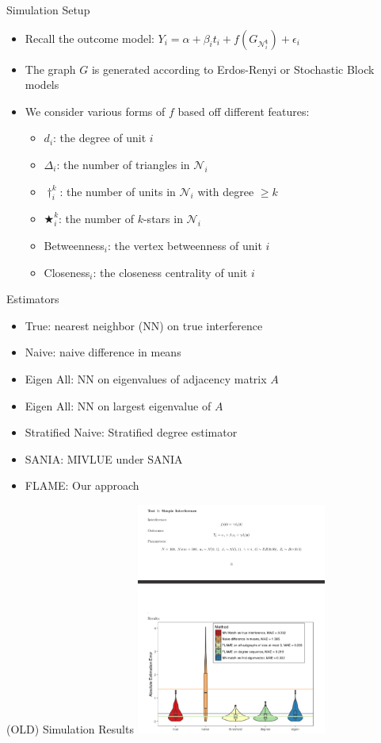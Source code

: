 \documentclass[newPxFont,numfooter,sectionpages]{beamer}
\begin{document}
\begin{frame}{Simulation Setup}
	\begin{itemize}
		\item Recall the outcome model: $Y_i = \alpha + \beta_i t_i + f(G_{\mathcal{N}_i^\mathbf{t}}) + \epsilon_i$
		\item The graph $G$ is generated according to Erdos-Renyi or Stochastic Block models
		\item We consider various forms of $f$ based off different features:
		\begin{itemize}
			\item $d_i$: the degree of unit $i$
   			 \item $\Delta_i$: the number of triangles in $\mathcal{N}_i$
   			 \item $\dagger_i^k$: the number of units in $\mathcal{N}_i$ with degree $\geq k$
 			 \item $\bigstar_i^k$: the number of $k$-stars in $\mathcal{N}_i$
   			 \item Betweenness$_i$: the vertex betweenness of unit $i$
    			\item Closeness$_i$: the closeness centrality of unit $i$
		\end{itemize}
	\end{itemize}
\end{frame}
\begin{frame}{Estimators}
	\begin{itemize}
		\item True: nearest neighbor (NN) on true interference
		\item Naive: naive difference in means
		\item Eigen All: NN on eigenvalues of adjacency matrix $A$
		\item Eigen All: NN on largest eigenvalue of $A$
		\item Stratified Naive: Stratified degree estimator
		\item SANIA: MIVLUE under SANIA
		\item FLAME: Our approach
	\end{itemize}
\end{frame}
\begin{frame}{(OLD) Simulation Results}
\centering
\includegraphics[height=3in]{simple.png}
\end{frame}
\end{document}
